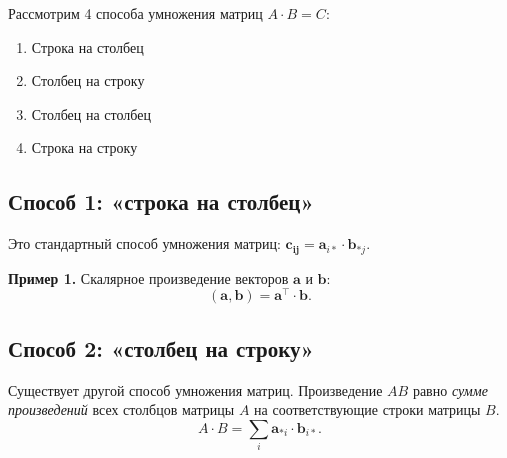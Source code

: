 \documentclass[11pt,a4paper]{article}
\providecommand{\tightlist}{%
      \setlength{\itemsep}{0pt}\setlength{\parskip}{0pt}}
\begin{document}
Рассмотрим 4 способа умножения матриц \(A \cdot B = C\):

\begin{enumerate}
\def\labelenumi{\arabic{enumi}.}
\tightlist
\item
  Строка на столбец
\item
  Столбец на строку
\item
  Столбец на столбец
\item
  Строка на строку
\end{enumerate}

    \hypertarget{ux441ux43fux43eux441ux43eux431-1-ux441ux442ux440ux43eux43aux430-ux43dux430-ux441ux442ux43eux43bux431ux435ux446}{%
\subsection{Способ 1: «строка на
столбец»}\label{ux441ux43fux43eux441ux43eux431-1-ux441ux442ux440ux43eux43aux430-ux43dux430-ux441ux442ux43eux43bux431ux435ux446}}

Это стандартный способ умножения матриц:
\(\mathbf{c_{ij}} = \mathbf{a}_{i*} \cdot \mathbf{b}_{*j}\).

\textbf{Пример 1.} Скалярное произведение векторов \(\mathbf{a}\) и
\(\mathbf{b}\):
\[ (\mathbf{a}, \mathbf{b}) = \mathbf{a}^\top \cdot \mathbf{b}. \]

    \hypertarget{ux441ux43fux43eux441ux43eux431-2-ux441ux442ux43eux43bux431ux435ux446-ux43dux430-ux441ux442ux440ux43eux43aux443}{%
\subsection{Способ 2: «столбец на
строку»}\label{ux441ux43fux43eux441ux43eux431-2-ux441ux442ux43eux43bux431ux435ux446-ux43dux430-ux441ux442ux440ux43eux43aux443}}

Существует другой способ умножения матриц. Произведение \(AB\) равно
\emph{сумме произведений} всех столбцов матрицы \(A\) на соответствующие
строки матрицы \(B\).
\[ A \cdot B = \sum_i \mathbf{a}_{*i} \cdot \mathbf{b}_{i*}. \]
\end{document}
